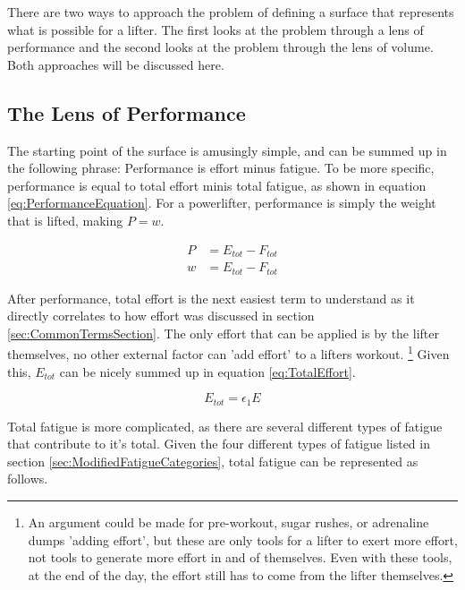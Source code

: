 There are two ways to approach the problem of defining a surface that represents what is possible for a lifter. The first looks at the problem through a lens of performance and the second looks at the problem through the lens of volume. Both approaches will be discussed here.

\subsection{The Lens of Performance}
\label{sec:PotentialSurfaceLensOfPerformance}

The starting point of the surface is amusingly simple, and can be summed up in the following phrase: Performance is effort minus fatigue. To be more specific, performance is equal to total effort minis total fatigue, as shown in equation \ref{eq:PerformanceEquation}. For a powerlifter, performance is simply the weight that is lifted, making $P=w$.

\begin{equation}
	\label{eq:PerformanceEquation}
	\begin{split}
			P &= E_{tot}-F_{tot} \\
			w &= E_{tot}-F_{tot}
	\end{split}
\end{equation}

After performance, total effort is the next easiest term to understand as it directly correlates to how effort was discussed in section \ref{sec:CommonTermsSection}. The only effort that can be applied is by the lifter themselves, no other external factor can 'add effort' to a lifters workout. \footnote{An argument could be made for pre-workout, sugar rushes, or adrenaline dumps 'adding effort', but these are only tools for a lifter to exert more effort, not tools to generate more effort in and of themselves. Even with these tools, at the end of the day, the effort still has to come from the lifter themselves.} Given this, $E_{tot}$ can be nicely summed up in equation \ref{eq:TotalEffort}.

\begin{equation}
	\label{eq:TotalEffort}
	E_{tot}=\epsilon_1 E
\end{equation}

Total fatigue is more complicated, as there are several different types of fatigue that contribute to it's total. Given the four different types of fatigue listed in section \ref{sec:ModifiedFatigueCategories}, total fatigue can be represented as follows.

